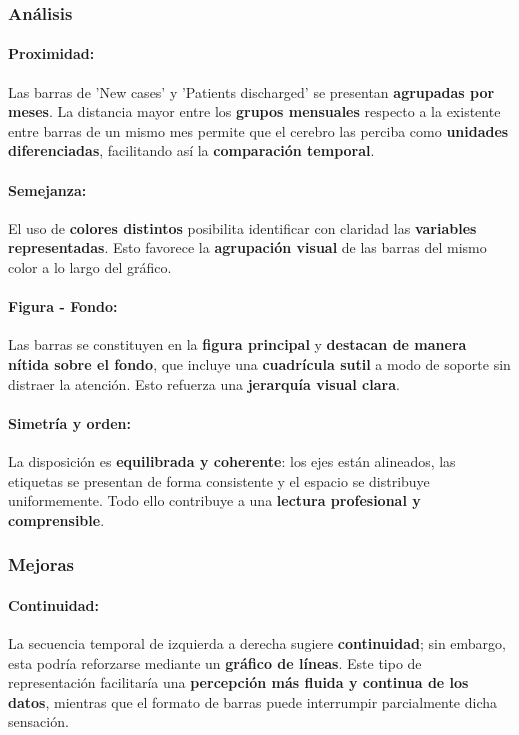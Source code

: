 \documentclass[12pt,a4paper]{article}
\begin{document}
\subsubsection{Análisis}

\paragraph{Proximidad:}
Las barras de 'New cases' y 'Patients discharged' se presentan \textbf{agrupadas por meses}. La distancia mayor entre los \textbf{grupos mensuales} respecto a la existente entre barras de un mismo mes permite que el cerebro las perciba como \textbf{unidades diferenciadas}, facilitando así la \textbf{comparación temporal}.

\paragraph{Semejanza:} 
El uso de \textbf{colores distintos} posibilita identificar con claridad las \textbf{variables representadas}. Esto favorece la \textbf{agrupación visual} de las barras del mismo color a lo largo del gráfico.

\paragraph{Figura - Fondo:}
Las barras se constituyen en la \textbf{figura principal} y \textbf{destacan de manera nítida sobre el fondo}, que incluye una \textbf{cuadrícula sutil} a modo de soporte sin distraer la atención. Esto refuerza una \textbf{jerarquía visual clara}.

\paragraph{Simetría y orden:}
La disposición es \textbf{equilibrada y coherente}: los ejes están alineados, las etiquetas se presentan de forma consistente y el espacio se distribuye uniformemente. Todo ello contribuye a una \textbf{lectura profesional y comprensible}.

\subsubsection{Mejoras}

\paragraph{Continuidad:}
La secuencia temporal de izquierda a derecha sugiere \textbf{continuidad}; sin embargo, esta podría reforzarse mediante un \textbf{gráfico de líneas}. Este tipo de representación facilitaría una \textbf{percepción más fluida y continua de los datos}, mientras que el formato de barras puede interrumpir parcialmente dicha sensación.
\end{document}
